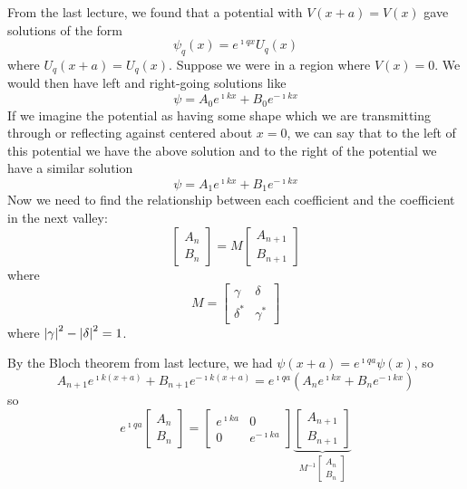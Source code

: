 \documentclass[a4paper,twoside,master.tex]{subfiles}
\begin{document}
From the last lecture, we found that a potential with $ V(x+a) = V(x) $ gave solutions of the form
\begin{equation}
    \psi_q(x) = e^{\imath q x} U_q(x)
\end{equation}
where $ U_q(x+a) = U_q(x) $. Suppose we were in a region where $ V(x) = 0 $. We would then have left and right-going solutions like
\begin{equation}
    \psi = A_0 e^{\imath kx} + B_0 e^{-\imath kx}
\end{equation}
If we imagine the potential as having some shape which we are transmitting through or reflecting against centered about $ x = 0 $, we can say that to the left of this potential we have the above solution and to the right of the potential we have a similar solution
\begin{equation}
    \psi = A_1 e^{\imath kx} + B_1 e^{-\imath kx}
\end{equation}
Now we need to find the relationship between each coefficient and the coefficient in the next valley:
\begin{equation}
    \begin{bmatrix}
        A_n \\ B_n
    \end{bmatrix}
    = M 
    \begin{bmatrix}
        A_{n+1} \\ B_{n+1}
    \end{bmatrix}
\end{equation}
where
\begin{equation}
    M = 
    \begin{bmatrix}
        \gamma & \delta \\ \delta^* & \gamma^*
    \end{bmatrix}
\end{equation}
where $ \abs{\gamma}^2 - \abs{\delta}^2 = 1 $.

By the Bloch theorem from last lecture, we had $ \psi(x+a) = e^{\imath q a} \psi(x) $, so
\begin{equation}
    A_{n+1} e^{\imath k(x+a)} + B_{n+1} e^{-\imath k(x+a)} = e^{\imath qa} \left( A_n e^{\imath kx} + B_n e^{-\imath kx} \right)
\end{equation}
so
\begin{equation}
    e^{\imath qa} 
    \begin{bmatrix}
        A_n\\B_n
    \end{bmatrix}
    = 
    \begin{bmatrix}
        e^{\imath ka} & 0 \\ 0 & e^{-\imath ka}
    \end{bmatrix}
    \underbrace{
        \begin{bmatrix}
            A_{n + 1} \\ B_{n + 1}
        \end{bmatrix}
    }_{
        M^{-1} 
        \begin{bmatrix}
        A_n \\ B_n
        \end{bmatrix}
    }
\end{equation}
\end{document}
